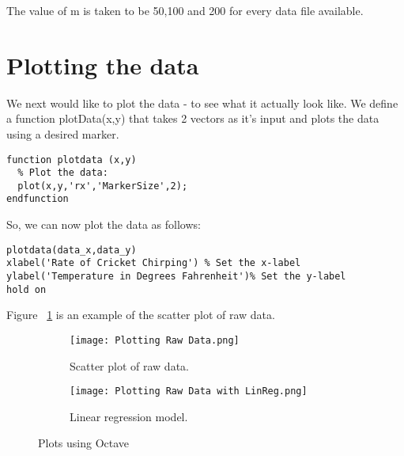 \documentclass[a4paper, 12pt]{report}
\begin{document}
The value of m is taken to be 50,100 and 200 for every data file available.

\section{Plotting the data}
We next would like to plot the data - to see what it actually look like.
We define a function plotData(x,y) that takes 2 vectors as it's input and plots the data using a desired marker.
\begin{lstlisting}[caption={Function to plot data.}]
function plotdata (x,y)
  % Plot the data:
  plot(x,y,'rx','MarkerSize',2);
endfunction
\end{lstlisting}

So, we can now plot the data as follows:
\begin{lstlisting}[caption={Plotting Data.}]
plotdata(data_x,data_y)
xlabel('Rate of Cricket Chirping') % Set the x-label
ylabel('Temperature in Degrees Fahrenheit')% Set the y-label
hold on
\end{lstlisting}
Figure ~\ref{fig:Plotting Raw Data} is an example of the scatter plot of raw data.
\begin{figure}
\centering
\begin{subfigure}{.5\textwidth}
  \centering
  \texttt{[image: Plotting Raw Data.png]}
  \caption{Scatter plot of raw data.}
  \label{fig:Plotting Raw Data}
\end{subfigure}%
\begin{subfigure}{.5\textwidth}
  \centering
  \texttt{[image: Plotting Raw Data with LinReg.png]}
  \caption{Linear regression model.}
  \label{fig:Raw Data with regression}
\end{subfigure}
\caption{Plots using Octave}
\label{fig:test}
\end{figure}
\end{document}
